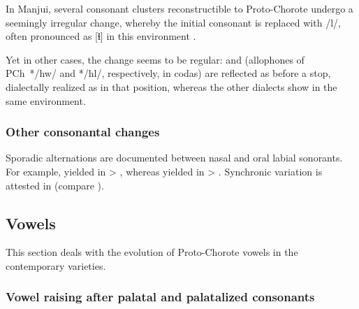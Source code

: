 In Manjui, several consonant clusters reconstructible to Proto-Chorote undergo a seemingly irregular change, whereby the initial consonant is replaced with /l/, often pronounced as [ɬ] in this environment \citep[26]{AG83}.

\begin{exe}
    \ex {}
    \ex {}
    \ex {}
\end{exe}

Yet in other cases, the change seems to be regular:  and  (allophones of PCh~*/hw/ and */hl/, respectively, in codas) are reflected as  before a stop, dialectally realized as  in that position, whereas the other dialects show  in the same environment.

\begin{exe}
    \ex {}
    \ex {}
\end{exe}

\subsubsection{Other consonantal changes}

Sporadic alternations are documented between nasal and oral labial sonorants. For example,  yielded  in  > , whereas  yielded  in  > . Synchronic variation is attested in  (compare ).

\subsection{Vowels}\label{ch-v}

This section deals with the evolution of Proto-Chorote vowels in the contemporary varieties.

\subsubsection{Vowel raising after palatal and palatalized consonants}\label{ch-v-r}

